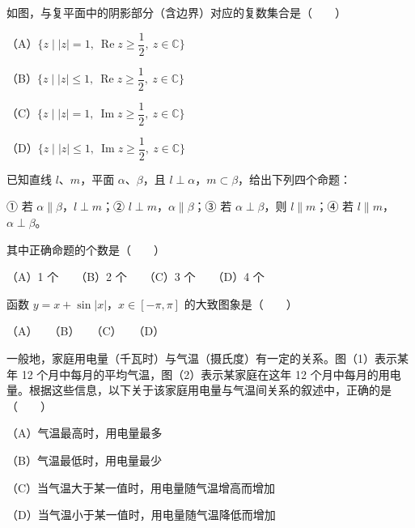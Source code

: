 \Needspace{0.4\textheight}
\begin{question}
如图，与复平面中的阴影部分（含边界）对应的复数集合是\mbox{（　　）}
\nopagebreak[4]
\begin{center}\end{center}
\nopagebreak[4]
（A）$\{z\mid |z|=1,\ \operatorname{Re}z\ge\dfrac12,\ z\in\mathbb C\}$

（B）$\{z\mid |z|\le1,\ \operatorname{Re}z\ge\dfrac12,\ z\in\mathbb C\}$

（C）$\{z\mid |z|=1,\ \operatorname{Im}z\ge\dfrac12,\ z\in\mathbb C\}$

（D）$\{z\mid |z|\le1,\ \operatorname{Im}z\ge\dfrac12,\ z\in\mathbb C\}$

\end{question}
\begin{question}
已知直线 $l\text{、}m$，平面 $\alpha\text{、}\beta$，且 $l\perp\alpha$，$m\subset\beta$，给出下列四个命题：

① 若 $\alpha\parallel\beta$，$l\perp m$；② $l\perp m$，$\alpha\parallel\beta$；③ 若 $\alpha\perp\beta$，则 $l\parallel m$；④ 若 $l\parallel m$，$\alpha\perp\beta$。

其中正确命题的个数是\mbox{（　　）}

（A）1 个　　（B）2 个　　（C）3 个　　（D）4 个

\Needspace{0.4\textheight}
\end{question}
\begin{question}
函数 $y=x+\sin|x|$，$x\in[-\pi,\pi]$ 的大致图象是\mbox{（　　）}
\nopagebreak[4]
\begin{center}\end{center}
\nopagebreak[4]
（A）　　（B）　　（C）　　（D）

\Needspace{0.4\textheight}
\end{question}
\begin{question}
一般地，家庭用电量（千瓦时）与气温（摄氏度）有一定的关系。图（1）表示某年 12 个月中每月的平均气温，图（2）表示某家庭在这年 12 个月中每月的用电量。根据这些信息，以下关于该家庭用电量与气温间关系的叙述中，正确的是\mbox{（　　）}
\nopagebreak[4]
\begin{center}\end{center}
\nopagebreak[4]
（A）气温最高时，用电量最多

（B）气温最低时，用电量最少

（C）当气温大于某一值时，用电量随气温增高而增加

（D）当气温小于某一值时，用电量随气温降低而增加

\end{question}

